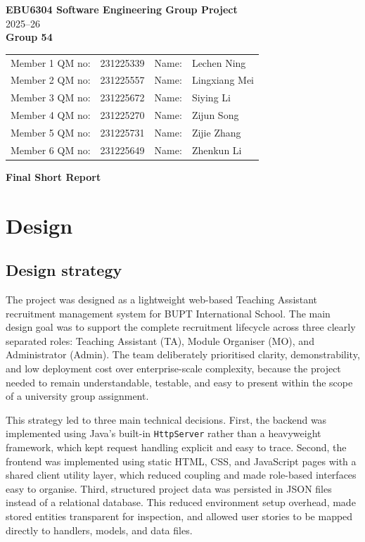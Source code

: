 \documentclass[11pt,a4paper]{article}
\begin{document}
\begin{center}
    {\Large \textbf{EBU6304 Software Engineering Group Project}}\\[4pt]
    2025--26\\[10pt]
    {\large \textbf{Group 54}}\\[12pt]
\end{center}

\begin{tabular}{llll}
Member 1 QM no: & 231225339 & Name: & Lechen Ning \\
Member 2 QM no: & 231225557 & Name: & Lingxiang Mei \\
Member 3 QM no: & 231225672 & Name: & Siying Li \\
Member 4 QM no: & 231225270 & Name: & Zijun Song \\
Member 5 QM no: & 231225731 & Name: & Zijie Zhang \\
Member 6 QM no: & 231225649 & Name: & Zhenkun Li \\
\end{tabular}

\vspace{10pt}

\begin{center}
    {\Large \textbf{Final Short Report}}
\end{center}

\section{Design}

\subsection{Design strategy}

The project was designed as a lightweight web-based Teaching Assistant recruitment management system for BUPT International School. The main design goal was to support the complete recruitment lifecycle across three clearly separated roles: Teaching Assistant (TA), Module Organiser (MO), and Administrator (Admin). The team deliberately prioritised clarity, demonstrability, and low deployment cost over enterprise-scale complexity, because the project needed to remain understandable, testable, and easy to present within the scope of a university group assignment.

This strategy led to three main technical decisions. First, the backend was implemented using Java's built-in \texttt{HttpServer} rather than a heavyweight framework, which kept request handling explicit and easy to trace. Second, the frontend was implemented using static HTML, CSS, and JavaScript pages with a shared client utility layer, which reduced coupling and made role-based interfaces easy to organise. Third, structured project data was persisted in JSON files instead of a relational database. This reduced environment setup overhead, made stored entities transparent for inspection, and allowed user stories to be mapped directly to handlers, models, and data files.
\end{document}
